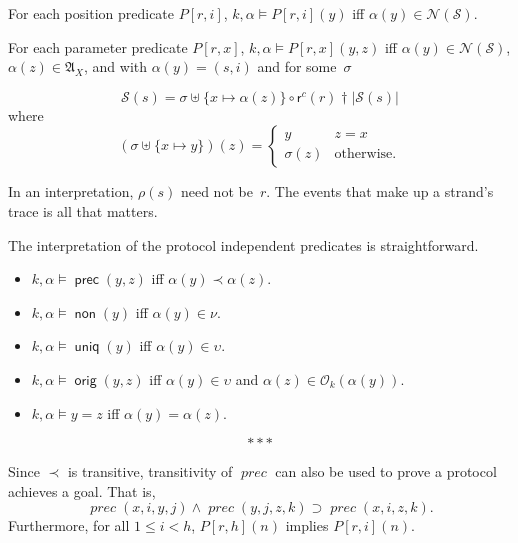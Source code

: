 \documentclass[12pt]{article}
\newcommand{\cn}[1]{\ensuremath{\operatorname{\mathsf{#1}}}}
\newcommand{\fn}[1]{\ensuremath{\operatorname{\mathit{#1}}}}
\newcommand{\prefix}[2]{#1\dagger#2}
\newcommand{\alg}[1]{\ensuremath{\mathfrak{#1}}}
\newcommand{\msg}{\alg{A}}
\newcommand{\ssp}{\ensuremath{\mathcal{S}}}
\newcommand{\nodes}{\ensuremath{\mathcal{N}}}
\newcommand{\rl}{\ensuremath{\rho}}
\newcommand{\role}{\mathsf{r}}
\newcommand{\orig}{\mathcal{O}}
\begin{document}
For each position predicate $P[r,i]$, $k,\alpha\models
P[r,i](y)$ iff $\alpha(y)\in\nodes(\ssp)$.

For each parameter predicate $P[r,x]$, $k,\alpha\models P[r,x](y,z)$
iff $\alpha(y)\in\nodes(\ssp)$, $\alpha(z)\in\msg_X$, and with
$\alpha(y)=(s, i)$ and for some~$\sigma$

\[\ssp(s)=\sigma\uplus\{x\mapsto\alpha(z)\}\circ
  \prefix{\role^c(r)}{|\ssp(s)|}\]
where \[(\sigma\uplus\{x\mapsto y\})(z)=
\left\{
\begin{array}{ll}
y&z=x\\
\sigma(z)&\mbox{otherwise.}
\end{array}\right.\]

In an interpretation, $\rl(s)$ need not be~$r$.  The events that make
up a strand's trace is all that matters.

The interpretation of the protocol independent predicates is
straightforward.
\begin{itemize}
\item $k,\alpha\models\cn{prec}(y,z)$ iff
  $\alpha(y)\prec\alpha(z)$.
\item $k,\alpha\models\cn{non}(y)$ iff $\alpha(y)\in\nu$.
\item $k,\alpha\models\cn{uniq}(y)$ iff $\alpha(y)\in\upsilon$.
\item $k,\alpha\models\cn{orig}(y,z)$ iff $\alpha(y)\in\upsilon$ and
  $\alpha(z)\in\orig_k(\alpha(y))$.
\item $k,\alpha\models y=z$ iff $\alpha(y)=\alpha(z)$.
\end{itemize}

\[\ast\ast\ast\]

Since $\prec$ is transitive, transitivity of \fn{prec} can also be
used to prove a protocol achieves a goal.  That is,
\[\fn{prec}(x,i,y,j)
\land\fn{prec}(y,j,z,k)\supset
\fn{prec}(x,i,z,k).\]
Furthermore, for all $1\leq i<h$, $P[r,h](n)$ implies $P[r,i](n)$.
\end{document}
